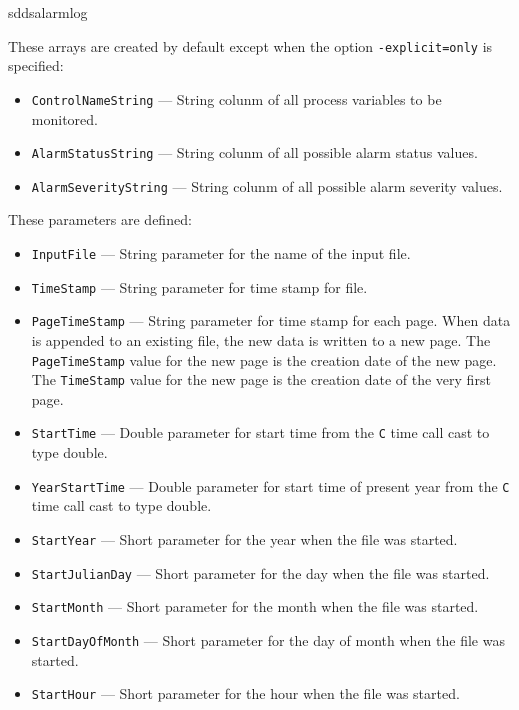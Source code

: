 \begin{sddsprog}{sddsalarmlog}
\begin{itemize}
These arrays are created by default except when the option {\tt -explicit=only} is specified:
  \begin{itemize}
    \item {\tt ControlNameString} --- String colunm of all process variables to be monitored.
    \item {\tt AlarmStatusString} --- String colunm of all possible alarm status values.
    \item {\tt AlarmSeverityString} --- String colunm of all possible alarm severity values.
  \end{itemize}

These parameters are defined:
  \begin{itemize}
    \item {\tt InputFile} --- String parameter for the name of the input file.
    \item {\tt TimeStamp} --- String parameter for time stamp for file.
    \item {\tt PageTimeStamp} --- String parameter for time stamp for each page. When data
                is appended to an existing file, the new data is written to a new
                page. The {\tt PageTimeStamp} value for the new page is the creation
                date of the new page. The {\tt TimeStamp} value for the new page is the creation
                date of the very first page.
    \item {\tt StartTime} --- Double parameter for start time from the {\tt C} time call cast to type double.
    \item {\tt YearStartTime} --- Double parameter for start time of present year from the {\tt C} time call cast to type double.
    \item {\verb+StartYear+} --- Short parameter for the year when the file was started.
    \item {\verb+StartJulianDay+} --- Short parameter for the day when the file was started.
    \item {\verb+StartMonth+} --- Short parameter for the month when the file was started.
    \item {\verb+StartDayOfMonth+} --- Short parameter for the day of month when the file was started.
    \item {\verb+StartHour+} --- Short parameter for the hour when the file was started.
  \end{itemize}
\end{itemize} %



\end{sddsprog}
